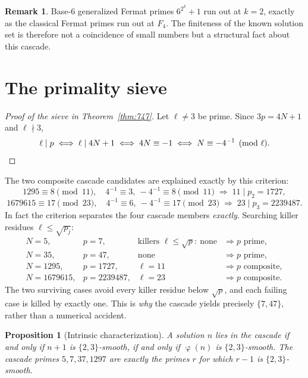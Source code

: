 \documentclass[11pt,reqno]{amsart}
\theoremstyle{plain}
\newtheorem{proposition}[theorem]{Proposition}
\theoremstyle{definition}
\newtheorem{remark}[theorem]{Remark}
\DeclareMathOperator{\tot}{\varphi}
\begin{document}
\begin{remark}
Base-$6$ generalized Fermat primes $6^{2^k}+1$ run out at $k=2$, exactly as the classical
Fermat primes run out at $F_4$. The finiteness of the known solution set is therefore not a
coincidence of small numbers but a structural fact about this cascade.
\end{remark}

\section{The primality sieve}\label{sec:sieve}

\begin{proof}[Proof of the sieve in Theorem~\ref{thm:747}]
Let $\ell\neq3$ be prime. Since $3p=4N+1$ and $\ell\nmid3$,
\[
  \ell\mid p \iff \ell\mid 4N+1 \iff 4N\equiv-1 \iff N\equiv-4^{-1} \pmod \ell . \qedhere
\]
\end{proof}

\noindent The two composite cascade candidates are explained exactly by this criterion:
\[
  1295\equiv 8 \pmod{11},\quad 4^{-1}\equiv3,\ -4^{-1}\equiv 8 \pmod{11}
  \;\Longrightarrow\; 11\mid p_2=1727,
\]
\[
  1679615\equiv 17 \pmod{23},\quad 4^{-1}\equiv6,\ -4^{-1}\equiv 17\pmod{23}
  \;\Longrightarrow\; 23\mid p_3=2239487 .
\]
In fact the criterion separates the four cascade members \emph{exactly}. Searching killer
residues $\ell\le\sqrt{p_j}$:
\[
\begin{array}{llll}
  N=5, & p=7, & \text{killers }\ell\le\sqrt p:\ \text{none} & \Rightarrow p\text{ prime},\\
  N=35, & p=47, & \text{none} & \Rightarrow p\text{ prime},\\
  N=1295, & p=1727, & \ell=11 & \Rightarrow p\text{ composite},\\
  N=1679615, & p=2239487, & \ell=23 & \Rightarrow p\text{ composite}.
\end{array}
\]
The two surviving cases avoid every killer residue below $\sqrt p$, and each failing case is
killed by exactly one. This is \emph{why} the cascade yields precisely $\{7,47\}$, rather than
a numerical accident.

\begin{proposition}[Intrinsic characterization]\label{prop:intrinsic}
A solution $n$ lies in the cascade if and only if $n+1$ is $\{2,3\}$-smooth, if and only if
$\tot(n)$ is $\{2,3\}$-smooth. The cascade primes $5,7,37,1297$ are exactly the primes $r$ for
which $r-1$ is $\{2,3\}$-smooth.
\end{proposition}
\end{document}
